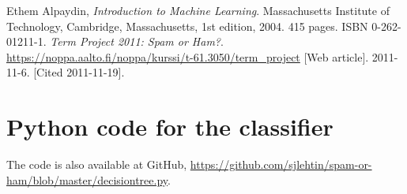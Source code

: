 \documentclass[a4paper,10pt]{article}
\begin{document}
\begin{thebibliography}{9}
  Ethem Alpaydin,
  \emph{Introduction to Machine Learning}.
  Massachusetts Institute of Technology, Cambridge, Massachusetts,
  1st edition,
  2004. 415 pages. ISBN 0-262-01211-1.
  \emph{Term Project 2011: Spam or Ham?}.
  \href{https://noppa.aalto.fi/noppa/kurssi/t-61.3050/term\_project}
  {https://noppa.aalto.fi/noppa/kurssi/t-61.3050/term\_project}
  [Web article]. 2011-11-6. [Cited 2011-11-19].

\end{thebibliography}

\afterpage{\clearpage} %
\pagebreak
\appendix
\section{Python code for the classifier}

The code is also available at GitHub,
\href{https://github.com/sjlehtin/spam-or-ham/blob/master/decisiontree.py}
{https://github.com/sjlehtin/spam-or-ham/blob/master/decisiontree.py}.




%
\end{document}
